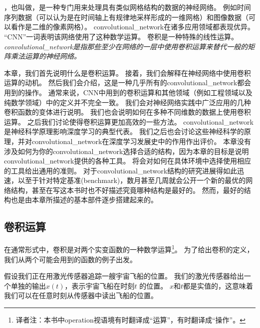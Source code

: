\chapter{}
\label{chap:convolutional_networks}

\citep{LeCun89a}，也叫做，是一种专门用来处理具有类似网格结构的数据的神经网络。
例如时间序列数据（可以认为是在时间轴上有规律地采样形成的一维网格）和图像数据（可以看作是二维的像素网格）。
\gls{convolutional_network}在诸多应用领域都表现优异。
``\gls{CNN}''一词表明该网络使用了这种数学运算。
卷积是一种特殊的线性运算。
\emph{\gls{convolutional_network}是指那些至少在网络的一层中使用卷积运算来替代一般的矩阵乘法运算的神经网络。}

本章，我们首先说明什么是卷积运算。
接着，我们会解释在神经网络中使用卷积运算的动机。
然后我们会介绍，这是一种几乎所有的\gls{convolutional_network}都会用到的操作。
通常来说，\gls{CNN}中用到的卷积运算和其他领域（例如工程领域以及纯数学领域）中的定义并不完全一致。
我们会对神经网络实践中广泛应用的几种卷积函数的变体进行说明。
我们也会说明如何在多种不同维数的数据上使用卷积运算。
之后我们讨论使得卷积运算更加高效的一些方法。
\gls{convolutional_network}是神经科学原理影响深度学习的典型代表。
我们之后也会讨论这些神经科学的原理，并对\gls{convolutional_network}在深度学习发展史中的作用作出评价。
本章没有涉及如何为你的\gls{convolutional_network}选择合适的结构，因为本章的目标是说明\gls{convolutional_network}提供的各种工具。
将会对如何在具体环境中选择使用相应的工具给出通用的准则。
对于\gls{convolutional_network}结构的研究进展得如此迅速，以至于针对特定基准(benchmark)，数月甚至几周就会公开一个新的最优的网络结构，甚至在写这本书时也不好描述究竟哪种结构是最好的。
然而，最好的结构也是由本章所描述的基本部件逐步搭建起来的。

 
\section{卷积运算}
\label{sec:the_convolution_operation}

在通常形式中，卷积是对两个实变函数的一种数学运算\footnote{译者注：本书中operation视语境有时翻译成``运算''，有时翻译成``操作''。}。
为了给出卷积的定义，我们从两个可能会用到的函数的例子出发。

假设我们正在用激光传感器追踪一艘宇宙飞船的位置。
我们的激光传感器给出一个单独的输出$x(t)$，表示宇宙飞船在时刻$t$ 的位置。
$x$和$t$都是实值的，这意味着我们可以在任意时刻从传感器中读出飞船的位置。


